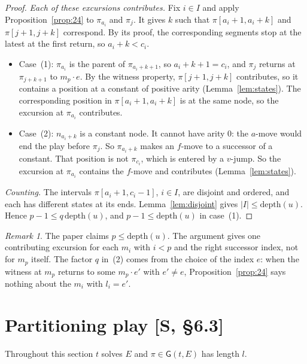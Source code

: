 \documentclass[11pt]{article}
\newcommand{\depth}{\mathrm{depth}}
\newcommand{\Gm}{\mathsf{G}}
\newcommand{\suc}[2]{#1{\cdot}#2}
\newcommand{\iv}[2]{\pi[#1,#2]}
\theoremstyle{plain}
\theoremstyle{definition}
\theoremstyle{remark}
\newtheorem{remark}[theorem]{Remark}
\begin{document}
\begin{proof}
\emph{Each of these excursions contributes.}  Fix $i\in I$ and apply
Proposition~\ref{prop:24} to $\pi_{a_i}$ and $\pi_j$.  It gives $k$ such
that $\iv{a_i+1}{a_i+k}$ and $\iv{j+1}{j+k}$ correspond.  By its proof,
the corresponding segments stop at the latest at the first return, so
$a_i+k<c_i$.
\begin{itemize}
\item Case~(1): $\pi_{a_i}$ is the parent of $\pi_{a_i+k+1}$, so
  $a_i+k+1=c_i$, and $\pi_j$ returns at $\pi_{j+k+1}$ to $\suc{m_p}e$.
  By the witness property, $\iv{j+1}{j+k}$ contributes, so it contains
  a position at a constant of positive arity (Lemma~\ref{lem:states}).
  The corresponding position in $\iv{a_i+1}{a_i+k}$ is at the same
  node, so the excursion at $\pi_{a_i}$ contributes.
\item Case~(2): $n_{a_i+k}$ is a constant node.  It cannot have arity
  $0$: the $a$-move would end the play before $\pi_j$.  So $\pi_{a_i+k}$
  makes an $f$-move to a successor of a constant.  That position is not
  $\pi_{c_i}$, which is entered by a $v$-jump.  So the excursion at
  $\pi_{a_i}$ contains the $f$-move and contributes
  (Lemma~\ref{lem:states}).
\end{itemize}

\emph{Counting.}  The intervals $\iv{a_i+1}{c_i-1}$, $i\in I$, are
disjoint and ordered, and each has different states at its ends.
Lemma~\ref{lem:disjoint} gives $|I|\le\depth(u)$.  Hence
$p-1\le q\,\depth(u)$, and $p-1\le\depth(u)$ in case~(1).
\end{proof}

\begin{remark}
The paper claims $p\le\depth(u)$.  The argument gives one contributing
excursion for each $m_i$ with $i<p$ and the right successor index, not
for $m_p$ itself.  The factor $q$ in~(2) comes from the choice of the
index $e$: when the witness at $m_p$ returns to some $\suc{m_p}{e'}$
with $e'\ne e$, Proposition~\ref{prop:24} says nothing about the
$m_i$ with $l_i=e'$.
\end{remark}

\section{Partitioning play [S, \S6.3]}\label{sec:partition}

Throughout this section $t$ solves $E$ and $\pi\in\Gm(t,E)$ has length
$l$.
\end{document}
